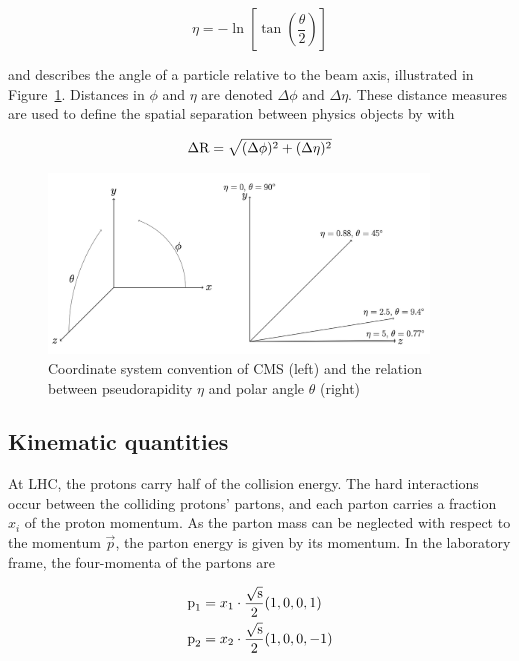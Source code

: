 \begin{equation}
  \eta=-\ln \left[\tan \left(\frac{\theta}{2}\right)\right]
\end{equation}

and describes the angle of a particle relative to the beam axis, illustrated in Figure~\ref{fig:coordinate}. Distances in $\phi$ and $\eta$ are denoted $\Delta\phi$ and $\Delta\eta$. These distance measures are used to define the spatial separation between physics objects by \dr with

\begin{equation}
  \Delta \text{R}=\sqrt{(\Delta \phi)^{2}+(\Delta \eta)^{2}}
\end{equation}

\begin{figure}[htbp]
  \centering
  \includegraphics[width=0.9\textwidth]{plots/chapter3/coordinate.png}
  \caption{Coordinate system convention of CMS (left) and the relation between pseudorapidity $\eta$ and polar angle $\theta$ (right)}
  \label{fig:coordinate}
\end{figure}

\subsection{Kinematic quantities}
At LHC, the protons carry half of the collision energy. The hard interactions occur between the colliding protons' partons, and each parton carries a fraction $x_i$ of the proton momentum. As the parton mass can be neglected with respect to the momentum $\vec{p}$, the parton energy is given by its momentum. In the laboratory frame, the four-momenta of the partons are

\begin{equation}
  \begin{aligned}
    \text{p}_{1}&=x_{1} \cdot \frac{\sqrt{\text{s}}}{2}(1,0,0,1) \\
    \text{p}_{2}&=x_{2} \cdot \frac{\sqrt{\text{s}}}{2}(1,0,0,-1)
  \end{aligned}
\end{equation}

